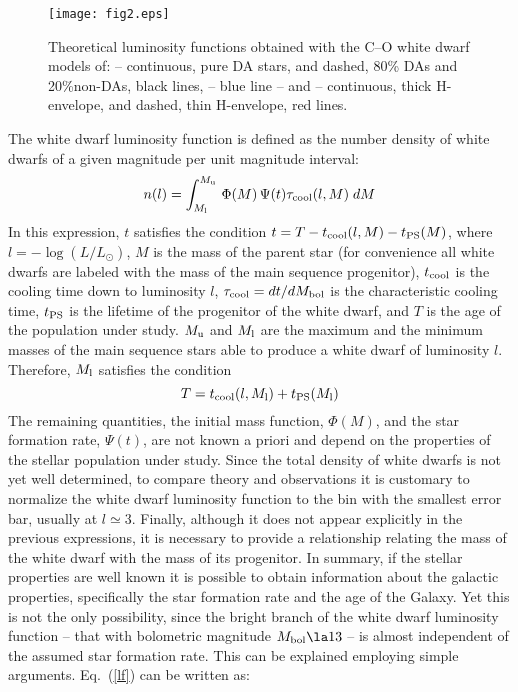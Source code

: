 \documentclass[useAMS,usenatbib]{mnras}
\begin{document}
\begin{figure}
\centering
\texttt{[image: fig2.eps]}
\caption{Theoretical luminosity functions obtained with the C--O white  dwarf models 
of:  \citet{sala10} -- continuous, pure DA stars, and dashed, 80\% DAs and 20\%non-DAs,   black lines,  \citet{rene10} -- blue line -- and \citet{font01} -- continuous, thick H-envelope, and dashed, thin H-envelope, red lines.}
\label{fig2}
\end{figure}

The white dwarf  luminosity function is defined as  the number density
of white dwarfs of a given magnitude per unit magnitude interval:
%
\begin{equation}
n(l) = \int^{M_{\rm u}}_{M_{\rm l}}\,\Phi(M)\,\Psi(t)
\tau_{\rm cool}(l,M) \;dM
\label{lf}
\end{equation}
%
In  this  expression,  $t$  satisfies   the  condition  $t  =  T-t_{\rm
cool}(l,M)-t_{\rm PS}(M)$,  where $l  = -\log (L/L_\odot)$,  $M$ is
the mass  of the  parent star  (for convenience  all white  dwarfs are
labeled with the mass of the main sequence progenitor), $t_{\rm cool}$
is   the   cooling   time   down   to   luminosity   $l$,   $\tau_{\rm
cool}=dt/dM_{\rm  bol}$ is  the characteristic  cooling time,  $t_{\rm
PS}$ is the lifetime of the progenitor  of the white dwarf, and $T$ is
the age  of the population under  study.  $M_{\rm u}$ and  $M_{\rm l}$
are the maximum and the minimum masses of the main sequence stars able
to produce  a white  dwarf of luminosity  $l$. Therefore,  $M_{\rm l}$
satisfies the condition
%
\begin{equation} 
T = t_{\rm cool}(l,M_{\rm l}) + t_{\rm PS}(M_{\rm l})
\label{tml}
\end{equation}
%
The remaining  quantities, the  initial mass function,  $\Phi(M)$, and
the star formation rate, $\Psi(t)$, are  not known a priori and depend
on the  properties of the  stellar population under study.   Since the
total density of  white dwarfs is not yet well  determined, to compare
theory and observations  it is customary to normalize  the white dwarf
luminosity function to the bin with the smallest error bar, usually at
$l \simeq 3$.  Finally, although it  does not appear explicitly in the
previous  expressions,  it  is  necessary  to  provide  a  relationship
relating  the  mass   of  the  white  dwarf  with  the   mass  of  its
progenitor. In summary, if the stellar properties are well known it is
possible to  obtain information about the  galactic properties, specifically
the star formation rate and the age of the Galaxy. Yet this is not the
only  possibility,  since  the  bright   branch  of  the  white  dwarf
luminosity function -- that with bolometric magnitude $M_{\rm bol} \la
13$ -- is almost independent of the assumed star formation rate.  This
can be explained employing simple arguments.  Eq.~(\ref{lf}) can be written as:
\end{document}
